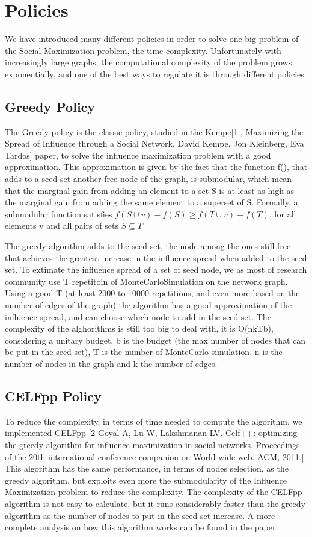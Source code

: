 \newpage
\section{Policies}

We have introduced many different policies in order to solve one big problem of the Social Maximization problem, the time complexity. Unfortunately with increasingly large graphs, the computational complexity of the problem grows exponentially, and one of the best ways to regulate it is through different policies.


\subsection{Greedy Policy}

The Greedy policy is the classic policy, studied in the Kempe[1 , Maximizing the Spread of Influence through a Social
Network, David Kempe, Jon Kleinberg, Eva Tardos] paper, to solve the influence maximization problem with a good approximation. This approximation is given by the fact that the function f(), that adds to a seed set another free node of the graph, is submodular, which mean that the marginal gain from adding an element to a set S is at least as high as the marginal gain from adding the same element to a superset of S.
Formally, a submodular function satisfies
$f(S \cup {v}) - f(S) \geq f(T \cup {v}) - f(T)$,
for all elements v and all pairs of sets $S  \subseteq T$

The greedy algorithm adds to the seed set, the node among the ones still free that achieves the greatest increase in the influence spread when added to the seed set.
To extimate the influence spread of a set of seed node, we as most of research community use T repetitoin of MonteCarloSimulation on the network graph.
Using a good T (at least 2000 to 10000 repetitions, and even more based on the number of edges of the graph) the algorithm has a good approximation of the influence spread, and can choose which node to add in the seed set.
The complexity of the alghorithms is still too big to deal with, it is O(nkTb), considering a unitary budget, b is the budget (the max number of nodes that can be put in the seed set),
T is the number of MonteCarlo simulation, n is the number of nodes in the graph and k the number of edges.
\subsection{CELFpp Policy}
To reduce the complexity, in terms of time needed to compute the algorithm, we implemented CELFpp [2 Goyal A, Lu W, Lakshmanan LV. Celf++: optimizing the greedy algorithm for influence maximization in social networks. Proceedings of the 20th international conference companion on World wide web. ACM, 2011.].
This algorithm has the same performance, in terms of nodes selection, as the greedy algorithm, but exploits even more the submodularity of the Influence Maximization problem to reduce the complexity.
The complexity of the CELFpp algorithm is not easy to calculate, but it runs considerably faster than the greedy algorithm as the number of nodes to put in the seed set increase.
A more complete analysis on how this algorithm works can be found in the paper.

